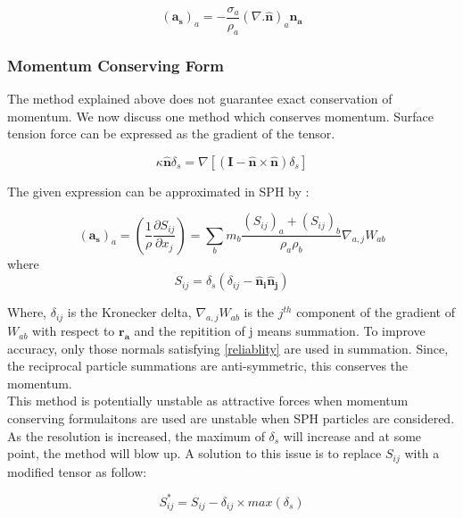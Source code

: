 \begin{equation}
 (\mathbf{a_s})_a = -\frac{\sigma_a}{\rho_a}(\nabla.\mathbf{\hat n})_a \mathbf{n_a}
\end{equation}


\subsubsection{Momentum Conserving Form}
The method explained above does not guarantee exact conservation of momentum. We now discuss one method which conserves momentum. Surface tension force can be expressed as the gradient of the tensor. \cite{Surface}

\begin{equation}
 \kappa \mathbf{\hat n} \delta_s = \nabla[(\mathbf{I} - \mathbf{\hat n}\times\mathbf{\hat n})\delta_s]
\end{equation}

\noindent
The given expression can be approximated in SPH by \cite{Morris}:

\begin{equation}
 (\mathbf{a_s})_a = \left( \frac{1}{\rho} \frac{\partial S_{ij}}{\partial x_j} \right) = \sum_b m_b \frac{(S_{ij})_a + (S_{ij})_b}{\rho_a \rho_b} \nabla_{a, j} W_{ab}
\end{equation}
\noindent
where 
\begin{equation}
 S_{ij} = \delta_s(\delta_{ij} - \mathbf{\hat n_i}\mathbf{\hat n_j})
\end{equation}

\noindent
Where, $\delta_{ij}$ is the Kronecker delta, $\nabla_{a,j}W_{ab}$ is the $j^{th}$ component of the gradient of $W_{ab}$ with respect to $\mathbf{r_a}$ and the repitition of j means summation. To improve accuracy, only those normals satisfying \ref{reliablity} are used in summation. Since, the reciprocal particle summations are anti-symmetric, this conserves the momentum.\\

This method is potentially unstable as attractive forces when momentum conserving formulaitons are used are unstable when SPH particles are considered.\\
As the resolution is increased, the maximum of $\delta_s$ will increase and at some point, the method will blow up. A solution to this issue is to replace $S_{ij}$ with a modified tensor as follow:

\begin{equation}
 S_{ij}^* = S_{ij} - \delta_{ij}\times max(\delta_s)
\end{equation}


